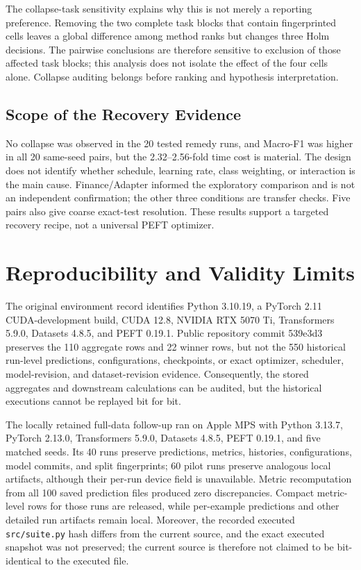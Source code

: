\documentclass{SPC}
\begin{document}
The collapse-task sensitivity explains why this is not merely a reporting preference. Removing the two complete task blocks that contain fingerprinted cells leaves a global difference among method ranks but changes three Holm decisions. The pairwise conclusions are therefore sensitive to exclusion of those affected task blocks; this analysis does not isolate the effect of the four cells alone. Collapse auditing belongs before ranking and hypothesis interpretation.

\subsection{Scope of the Recovery Evidence}

No collapse was observed in the 20 tested remedy runs, and Macro-F1 was higher in all 20 same-seed pairs, but the 2.32--2.56-fold time cost is material. The design does not identify whether schedule, learning rate, class weighting, or interaction is the main cause. Finance/Adapter informed the exploratory comparison and is not an independent confirmation; the other three conditions are transfer checks. Five pairs also give coarse exact-test resolution. These results support a targeted recovery recipe, not a universal PEFT optimizer.


\section{Reproducibility and Validity Limits}

The original environment record identifies Python 3.10.19, a PyTorch 2.11 CUDA-development build, CUDA 12.8, NVIDIA RTX 5070 Ti, Transformers 5.9.0, Datasets 4.8.5, and PEFT 0.19.1. Public repository commit 539e3d3 preserves the 110 aggregate rows and 22 winner rows, but not the 550 historical run-level predictions, configurations, checkpoints, or exact optimizer, scheduler, model-revision, and dataset-revision evidence. Consequently, the stored aggregates and downstream calculations can be audited, but the historical executions cannot be replayed bit for bit.

The locally retained full-data follow-up ran on Apple MPS with Python 3.13.7, PyTorch 2.13.0, Transformers 5.9.0, Datasets 4.8.5, PEFT 0.19.1, and five matched seeds. Its 40 runs preserve predictions, metrics, histories, configurations, model commits, and split fingerprints; 60 pilot runs preserve analogous local artifacts, although their per-run device field is unavailable. Metric recomputation from all 100 saved prediction files produced zero discrepancies. Compact metric-level rows for those runs are released, while per-example predictions and other detailed run artifacts remain local. Moreover, the recorded executed \texttt{src/suite.py} hash differs from the current source, and the exact executed snapshot was not preserved; the current source is therefore not claimed to be bit-identical to the executed file.
\end{document}
